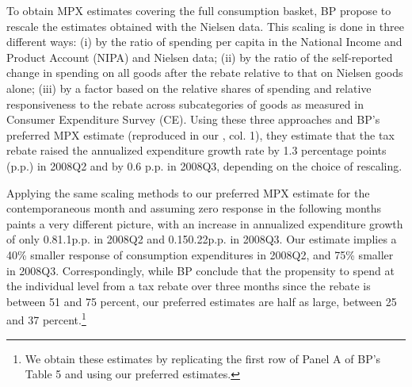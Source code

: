 \documentclass[english,11pt]{article}
\theoremstyle{plain}
\theoremstyle{plain}
\theoremstyle{plain}
\theoremstyle{plain}
\let\ref\Cref
\begin{document}
To obtain MPX estimates covering the full consumption basket, BP propose
to rescale the estimates obtained with the Nielsen data. This scaling
is done in three different ways: (i) by the ratio of spending per
capita in the National Income and Product Account (NIPA) and Nielsen
data; (ii) by the ratio of the self-reported change in spending on
all goods after the rebate relative to that on Nielsen goods alone;
(iii) by a factor based on the relative shares of spending and relative
responsiveness to the rebate across subcategories of goods as measured
in Consumer Expenditure Survey (CE). Using these three approaches
and BP's preferred MPX estimate (reproduced in our \ref{tab:replication_BP},
col. 1), they estimate that the tax rebate raised the annualized expenditure
growth rate by 1.3 percentage points (p.p.) in 2008Q2
and by 0.6 p.p. in 2008Q3, depending on the choice
of rescaling.

Applying the same scaling methods to our preferred MPX estimate for
the contemporaneous month and assuming zero response in the following
months paints a very different picture, with an increase in annualized
expenditure growth of only 0.8\textendash 1.1p.p. in 2008Q2 and 0.15\textendash 0.22p.p.
in 2008Q3. Our estimate implies a 40\% smaller response of consumption
expenditures in 2008Q2, and 75\% smaller in 2008Q3. Correspondingly,
while BP conclude that the propensity to spend at the individual level
from a tax rebate over three months since the rebate is between 51
and 75 percent, our preferred estimates are half as large, between
25 and 37 percent.\footnote{We obtain these estimates by replicating the first row of Panel A
of BP's Table 5 and using our preferred estimates.}
\end{document}
